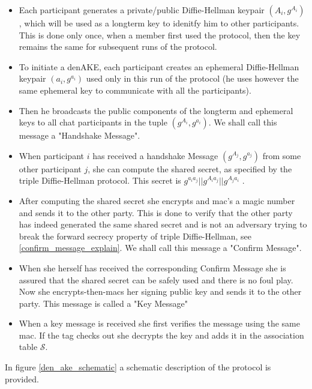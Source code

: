 \begin{itemize}

	\item[] Each participant generates a private/public Diffie-Hellman keypair $(A_i, g^{A_i})$, which will be used as a longterm key to idenitfy him to other participants. This
is done only once, when a member first used the protocol, then the key remains
the same for subsequent runs of the protocol.

	\item[] To initiate a denAKE, each participant creates an ephemeral Diffie-Hellman keypair
		$(a_i,g^{a_i})$ used only in this run of the protocol (he uses however the same ephemeral key
		to communicate with all the participants).

	\item[] Then he broadcasts the public components of the longterm and ephemeral keys to
		all chat participants in the tuple $(g^{A_i}, g^{a_i})$. We shall call this
		message a "Handshake Message".

	\item[] When participant $i$ has received a handshake Message $(g^{A_j}, g^{a_j})$ from some
		other participant $j$, she can compute the shared secret, as specified by the triple
		Diffie-Hellman protocol. This secret is $g^{a_ia_j} || g^{A_ia_j} || g^{A_ja_i}$
		.

	\item[] After computing the shared secret she encrypts and mac's a magic number and sends it
		to the other party. This is done to verify that the other party has indeed generated
		the same shared secret and is not an adversary trying to break the forward secrecy
		property of triple Diffie-Hellman, see \ref{confirm_message_explain}. We shall call
		this message a "Confirm Message".

	\item[] When she herself has received the corresponding Confirm Message she is assured that
		the shared secret can be safely used and there is no foul play. Now she
		encrypts-then-macs her signing public key and sends it to the other party. This
		message is called a "Key Message"


	\item[] When a key message is received she first verifies the message using the same mac.
		If the tag checks out she decrypts the key and adds it in the association table $\mathcal{S}$.
\end{itemize}

In figure \ref{den_ake_schematic} a schematic description of the protocol is provided.

